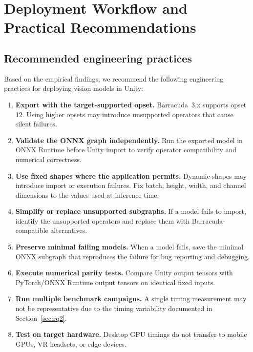 \documentclass[10pt,twocolumn,letterpaper]{article}
\begin{document}
\section{Deployment Workflow and Practical Recommendations}\label{sec:workflow}

\subsection{Recommended engineering practices}

Based on the empirical findings, we recommend the following engineering practices for deploying vision models in Unity:

\begin{enumerate}[nosep,leftmargin=*]
  \item \textbf{Export with the target-supported opset.} Barracuda~3.x supports opset 12. Using higher opsets may introduce unsupported operators that cause silent failures.
  \item \textbf{Validate the ONNX graph independently.} Run the exported model in ONNX Runtime before Unity import to verify operator compatibility and numerical correctness.
  \item \textbf{Use fixed shapes where the application permits.} Dynamic shapes may introduce import or execution failures. Fix batch, height, width, and channel dimensions to the values used at inference time.
  \item \textbf{Simplify or replace unsupported subgraphs.} If a model fails to import, identify the unsupported operators and replace them with Barracuda-compatible alternatives.
  \item \textbf{Preserve minimal failing models.} When a model fails, save the minimal ONNX subgraph that reproduces the failure for bug reporting and debugging.
  \item \textbf{Execute numerical parity tests.} Compare Unity output tensors with PyTorch/ONNX Runtime output tensors on identical fixed inputs.
  \item \textbf{Run multiple benchmark campaigns.} A single timing measurement may not be representative due to the timing variability documented in Section~\ref{sec:rq2}.
  \item \textbf{Test on target hardware.} Desktop GPU timings do not transfer to mobile GPUs, VR headsets, or edge devices.
\end{enumerate}
\end{document}
